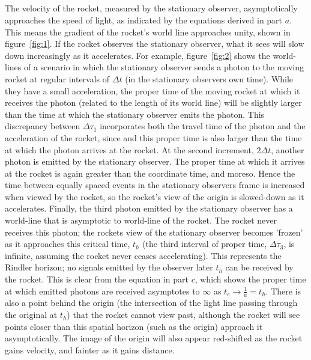\documentclass[a4paper]{article}
\begin{document}
\subsection{}
The velocity of the rocket, measured by the stationary observer, asymptotically approaches the speed of light, as indicated by the equations derived in part $a$. 
This means the gradient of the rocket's world line approaches unity, shown in figure~\ref{fig:1}. 
If the rocket observes the stationary observer, what it sees will slow down increasingly as it accelerates.
For example, figure~\ref{fig:2} shows the world-lines of a scenario in which the stationary observer sends a photon to the moving rocket at regular intervals of $\Delta t$ (in the stationary observers own time).
While they have a small acceleration, the proper time of the moving rocket at which it receives the photon (related to the length of its world line) will be slightly larger than the time at which the stationary observer emits the photon. This discrepancy between $\Delta \tau_1$ incorporates both the travel time of the photon and the acceleration of the rocket, since and this proper time is also larger than the time at which the photon arrives at the rocket.
At the second increment, $2\Delta t$, another photon is emitted by the stationary observer.
The proper time at which it arrives at the rocket is again greater than the coordinate time, and moreso. 
Hence the time between equally spaced events in the stationary observers frame is increased when viewed by the rocket, so the rocket's view of the origin is slowed-down as it accelerates.
Finally, the third photon emitted by the stationary observer has a world-line that is asymptotic to world-line of the rocket. 
The rocket never receives this photon; the rockets view of the stationary observer becomes 'frozen' as it approaches this critical time, $t_h$ (the third interval of proper time, $\Delta \tau_3$, is infinite, assuming the rocket never ceases accelerating).
This represents the Rindler horizon; no signals emitted by the observer later $t_h$ can be received by the rocket.
This is clear from the equation in part $c$, which shows the proper time at which emitted photons are received asymptotes to $\infty$ as $t_e \to \frac{1}{a} = t_h$.
There is also a point behind the origin (the intersection of the light line passing through the original at $t_h$) that the rocket cannot view past, although the rocket will see points closer than this spatial horizon (such as the origin) approach it asymptotically.
The image of the origin will also appear red-shifted as the rocket gains velocity, and fainter as it gains distance.
\end{document}
